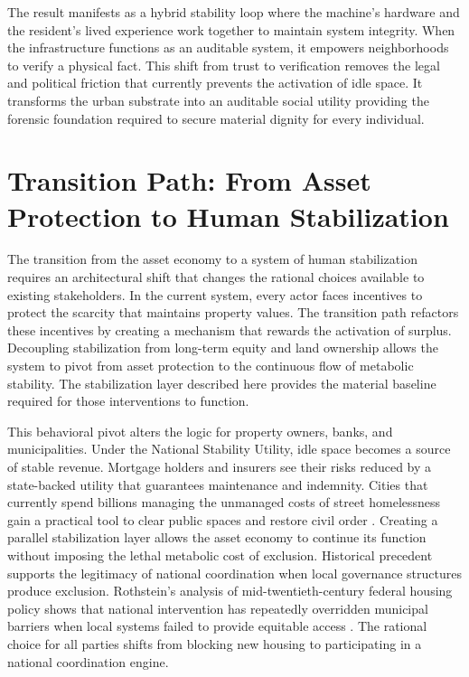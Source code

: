 \documentclass[12pt, letterpaper]{article}
\begin{document}
The result manifests as a hybrid stability loop where the machine's hardware and the resident's lived experience work together to maintain system integrity. When the infrastructure functions as an auditable system, it empowers neighborhoods to verify a physical fact. This shift from trust to verification removes the legal and political friction that currently prevents the activation of idle space. It transforms the urban substrate into an auditable social utility providing the forensic foundation required to secure material dignity for every individual.

\section{Transition Path: From Asset Protection to Human Stabilization}

The transition from the asset economy to a system of human stabilization requires an architectural shift that changes the rational choices available to existing stakeholders. In the current system, every actor faces incentives to protect the scarcity that maintains property values. The transition path refactors these incentives by creating a mechanism that rewards the activation of surplus. Decoupling stabilization from long-term equity and land ownership allows the system to pivot from asset protection to the continuous flow of metabolic stability. The stabilization layer described here provides the material baseline required for those interventions to function.

This behavioral pivot alters the logic for property owners, banks, and municipalities. Under the National Stability Utility, idle space becomes a source of stable revenue. Mortgage holders and insurers see their risks reduced by a state-backed utility that guarantees maintenance and indemnity. Cities that currently spend billions managing the unmanaged costs of street homelessness gain a practical tool to clear public spaces and restore civil order \citep{grants_pass_2024}. Creating a parallel stabilization layer allows the asset economy to continue its function without imposing the lethal metabolic cost of exclusion. Historical precedent supports the legitimacy of national coordination when local governance structures produce exclusion. Rothstein's analysis of mid-twentieth-century federal housing policy shows that national intervention has repeatedly overridden municipal barriers when local systems failed to provide equitable access \citep{rothstein_2017}. The rational choice for all parties shifts from blocking new housing to participating in a national coordination engine.
\end{document}
